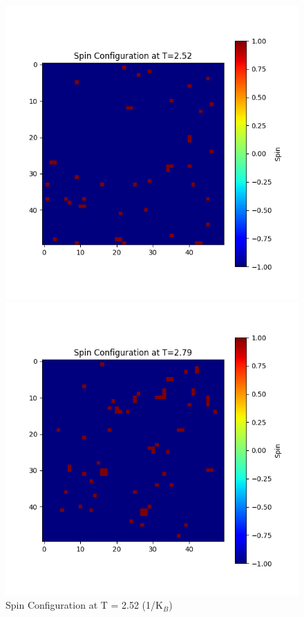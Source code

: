 \documentclass[11pt]{article}
\begin{document}
\begin{figure}[H]
    \centering
    \begin{minipage}{0.32\textwidth}
        \centering
        \includegraphics[width=\textwidth]{Spin_Configuration_at_T=2.52.png}
        \caption{Spin Configuration at T = 2.52 (1/K$_B$)}
        \label{fig:7}
    \end{minipage}\hfill
    \begin{minipage}{0.32\textwidth}
        \centering
        \includegraphics[width=\textwidth]{Spin_Configuration_at_T=2.79.png}

\end{minipage}
\end{figure}
\end{document}
